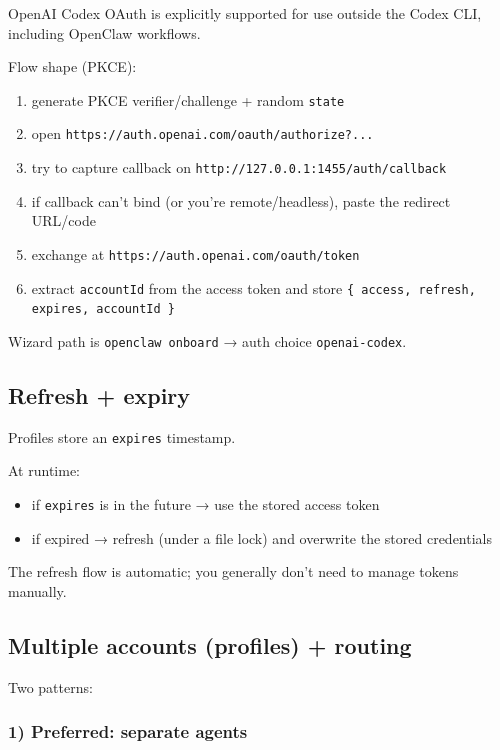 OpenAI Codex OAuth is explicitly supported for use outside the Codex CLI, including OpenClaw workflows.

Flow shape (PKCE):

\begin{enumerate}
  \item generate PKCE verifier/challenge + random \texttt{state}
  \item open \texttt{https://auth.openai.com/oauth/authorize?...}
  \item try to capture callback on \texttt{http://127.0.0.1:1455/auth/callback}
  \item if callback can’t bind (or you’re remote/headless), paste the redirect URL/code
  \item exchange at \texttt{https://auth.openai.com/oauth/token}
  \item extract \texttt{accountId} from the access token and store \texttt{\{ access, refresh, expires, accountId \}}
\end{enumerate}


Wizard path is \texttt{openclaw onboard} → auth choice \texttt{openai-codex}.

\subsection{Refresh + expiry}


Profiles store an \texttt{expires} timestamp.

At runtime:

\begin{itemize}
  \item if \texttt{expires} is in the future → use the stored access token
  \item if expired → refresh (under a file lock) and overwrite the stored credentials
\end{itemize}


The refresh flow is automatic; you generally don't need to manage tokens manually.

\subsection{Multiple accounts (profiles) + routing}


Two patterns:

\subsubsection{1) Preferred: separate agents}


